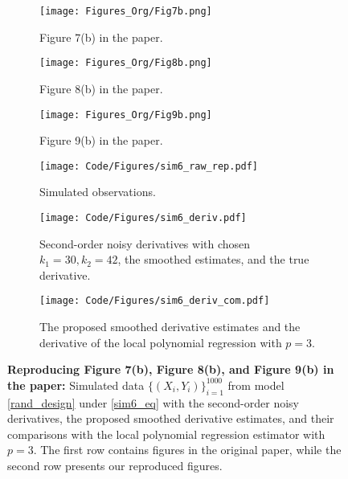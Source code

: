 \documentclass{uwstat572}
\theoremstyle{definition}
\theoremstyle{theorem}
\begin{document}
\begin{figure}[!t]
	\captionsetup[subfigure]{justification=centering}
	\begin{subfigure}[t]{0.32\linewidth}
		\centering
		\texttt{[image: Figures\_Org/Fig7b.png]}
		\caption{Figure 7(b) in the paper.}
	\end{subfigure}
	\hfil
	\begin{subfigure}[t]{0.32\linewidth}
		\centering
		\texttt{[image: Figures\_Org/Fig8b.png]}
		\caption{Figure 8(b) in the paper.}
	\end{subfigure}
	\hfil
	\begin{subfigure}[t]{0.32\linewidth}
		\centering
		\texttt{[image: Figures\_Org/Fig9b.png]}
		\caption{Figure 9(b) in the paper.}
	\end{subfigure}
	\begin{subfigure}[t]{0.32\linewidth}
		\centering
		\texttt{[image: Code/Figures/sim6\_raw\_rep.pdf]}
		\caption{Simulated observations.}
	\end{subfigure}
	\hfil
	\begin{subfigure}[t]{0.32\linewidth}
		\centering
		\texttt{[image: Code/Figures/sim6\_deriv.pdf]}
		\caption{Second-order noisy derivatives with chosen $k_1=30, k_2=42$, the smoothed estimates, and the true derivative.}
	\end{subfigure}
	\hfil
	\begin{subfigure}[t]{0.32\linewidth}
		\centering
		\texttt{[image: Code/Figures/sim6\_deriv\_com.pdf]}
		\caption{The proposed smoothed derivative estimates and the derivative of the local polynomial regression with $p=3$.}
	\end{subfigure}
	\caption{{\bf Reproducing Figure 7(b), Figure 8(b), and Figure 9(b) in the paper:} Simulated data $\{(X_i,Y_i)\}_{i=1}^{1000}$ from model \eqref{rand_design} under \eqref{sim6_eq} with the second-order noisy derivatives, the proposed smoothed derivative estimates, and their comparisons with the local polynomial regression estimator with $p=3$. The first row contains figures in the original paper, while the second row presents our reproduced figures.}
	\label{fig:sim6_rep}
\end{figure}
\end{document}
